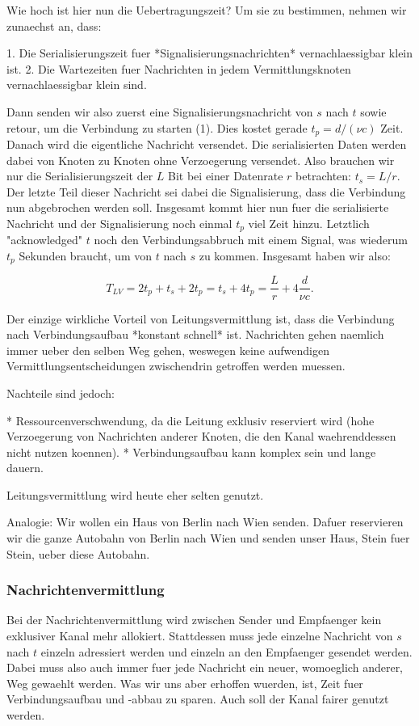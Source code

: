 Wie hoch ist hier nun die Uebertragungszeit? Um sie zu bestimmen, nehmen wir
zunaechst an, dass:

1. Die Serialisierungszeit fuer *Signalisierungsnachrichten* vernachlaessigbar
   klein ist.
2. Die Wartezeiten fuer Nachrichten in jedem Vermittlungsknoten
   vernachlaessigbar klein sind.

Dann senden wir also zuerst eine Signalisierungsnachricht von $s$ nach $t$ sowie
retour, um die Verbindung zu starten (1). Dies kostet gerade $t_p = d/(\nu c)$
Zeit. Danach wird die eigentliche Nachricht versendet. Die serialisierten Daten
werden dabei von Knoten zu Knoten ohne Verzoegerung versendet. Also brauchen wir
nur die Serialisierungszeit der $L$ Bit bei einer Datenrate $r$ betrachten: $t_s
= L/r$. Der letzte Teil dieser Nachricht sei dabei die Signalisierung, dass die
Verbindung nun abgebrochen werden soll. Insgesamt kommt hier nun fuer die
serialisierte Nachricht und der Signalisierung noch einmal $t_p$ viel Zeit
hinzu. Letztlich "acknowledged" $t$ noch den Verbindungsabbruch mit einem
Signal, was wiederum $t_p$ Sekunden braucht, um von $t$ nach $s$ zu
kommen. Insgesamt haben wir also:

$$T_{LV} = 2t_p + t_s + 2t_p = t_s + 4t_p = \frac{L}{r} + 4\frac{d}{\nu c} .$$

Der einzige wirkliche Vorteil von Leitungsvermittlung ist, dass die Verbindung
nach Verbindungsaufbau *konstant schnell* ist. Nachrichten gehen naemlich immer
ueber den selben Weg gehen, weswegen keine aufwendigen
Vermittlungsentscheidungen zwischendrin getroffen werden muessen.

Nachteile sind jedoch:

* Ressourcenverschwendung, da die Leitung exklusiv reserviert wird (hohe
  Verzoegerung von Nachrichten anderer Knoten, die den Kanal waehrenddessen
  nicht nutzen koennen).
* Verbindungsaufbau kann komplex sein und lange dauern.

Leitungsvermittlung wird heute eher selten genutzt.

Analogie: Wir wollen ein Haus von Berlin nach Wien senden. Dafuer reservieren
wir die ganze Autobahn von Berlin nach Wien und senden unser Haus, Stein fuer
Stein, ueber diese Autobahn.

\subsubsection{Nachrichtenvermittlung} 

Bei der Nachrichtenvermittlung wird zwischen Sender und Empfaenger kein
exklusiver Kanal mehr allokiert. Stattdessen muss jede einzelne Nachricht von
$s$ nach $t$ einzeln adressiert werden und einzeln an den Empfaenger gesendet
werden. Dabei muss also auch immer fuer jede Nachricht ein neuer, womoeglich
anderer, Weg gewaehlt werden. Was wir uns aber erhoffen wuerden, ist, Zeit fuer
Verbindungsaufbau und -abbau zu sparen. Auch soll der Kanal fairer genutzt
werden.

